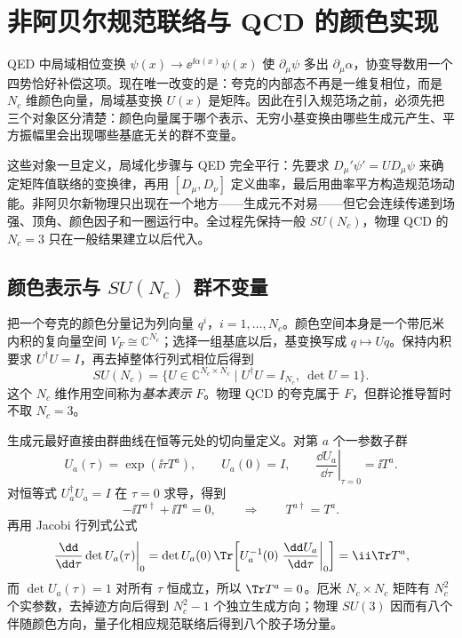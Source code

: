 \section{非阿贝尔规范联络与 QCD 的颜色实现}\label{sec:qcd-group-gauge-dp10}

QED 中局域相位变换 $\psi(x)\to \ee^{\ii\alpha(x)}\psi(x)$ 使 $\partial_\mu\psi$ 多出 $\partial_\mu\alpha$，协变导数用一个四势恰好补偿这项。现在唯一改变的是：夸克的内部态不再是一维复相位，而是 $N_c$ 维颜色向量，局域基变换 $U(x)$ 是矩阵。因此在引入规范场之前，必须先把三个对象区分清楚：颜色向量属于哪个表示、无穷小基变换由哪些生成元产生、平方振幅里会出现哪些基底无关的群不变量。

这些对象一旦定义，局域化步骤与 QED 完全平行：先要求 $D_\mu'\psi'=UD_\mu\psi$ 来确定矩阵值联络的变换律，再用 $[D_\mu,D_\nu]$ 定义曲率，最后用曲率平方构造规范场动能。非阿贝尔新物理只出现在一个地方——生成元不对易——但它会连续传递到场强、顶角、颜色因子和一圈运行中。全过程先保持一般 $SU(N_c)$，物理 QCD 的 $N_c=3$ 只在一般结果建立以后代入。

\subsection{颜色表示与 $SU(N_c)$ 群不变量}

把一个夸克的颜色分量记为列向量 $q^i$，$i=1,\ldots,N_c$。颜色空间本身是一个带厄米内积的复向量空间 $V_F\cong\mathbb C^{N_c}$；选择一组基底以后，基变换写成 $q\mapsto Uq$。保持内积要求 $U^\dagger U=I$，再去掉整体行列式相位后得到
\begin{equation}
 {
 SU(N_c)=\{U\in\mathbb C^{N_c\times N_c}\mid U^\dagger U=I_{N_c},\ \det U=1\}.}
 \label{eq:SUN-definition-dp10}
\end{equation}
这个 $N_c$ 维作用空间称为\emph{基本表示} $F$。物理 QCD 的夸克属于 $F$，但群论推导暂时不取 $N_c=3$。

生成元最好直接由群曲线在恒等元处的切向量定义。对第 $a$ 个一参数子群
\begin{equation*}
 U_a(\tau)=\exp(\ii\tau T^a),
 \qquad U_a(0)=I,
 \qquad
 \left.\frac{\dd U_a}{\dd\tau}\right|_{\tau=0}=\ii T^a .
\end{equation*}
对恒等式 $U_a^\dagger U_a=I$ 在 $\tau=0$ 求导，得到
\begin{equation*}
 -\ii T^{a\dagger}+\ii T^a=0,
 \qquad\Longrightarrow\qquad T^{a\dagger}=T^a.
\end{equation*}
再用 Jacobi 行列式公式
\begin{equation*}
 \left.\frac{\dd}{\dd\tau}\det U_a(\tau)\right|_{0}
 =\det U_a(0)\,
 \Tr\!\left[U_a^{-1}(0)\left.\frac{\dd U_a}{\dd\tau}\right|_0\right]
 =\ii\Tr T^a,
\end{equation*}
而 $\det U_a(\tau)=1$ 对所有 $\tau$ 恒成立，所以 $\Tr T^a=0$。厄米 $N_c\times N_c$ 矩阵有 $N_c^2$ 个实参数，去掉迹方向后得到 $N_c^2-1$ 个独立生成方向；物理 $SU(3)$ 因而有八个伴随颜色方向，量子化相应规范联络后得到八个胶子场分量。

